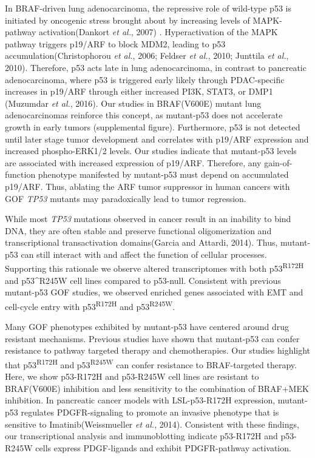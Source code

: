 In BRAF-driven lung adenocarcinoma, the repressive role of wild-type p53 is initiated by oncogenic stress brought about by increasing levels of MAPK-pathway activation(Dankort \emph{et al.}, 2007) . Hyperactivation of the MAPK pathway triggers p19/ARF to block MDM2, leading to p53 accumulation(Christophorou \emph{et al.}, 2006; Feldser \emph{et al.}, 2010; Junttila \emph{et al.}, 2010). Therefore, p53 acts late in lung adenocarcinoma, in contrast to pancreatic adenocarcinoma, where p53 is triggered early likely through PDAC-specific increases in p19/ARF through either increased PI3K, STAT3, or DMP1 (Muzumdar \emph{et al.}, 2016). Our studies in BRAF(V600E) mutant lung adenocarcinomas reinforce this concept, as mutant-p53 does not accelerate growth in early tumors (supplemental figure). Furthermore, p53 is not detected until later stage tumor development and correlates with p19/ARF expression and increased phospho-ERK1/2 levels. Our studies indicate that mutant-p53 levels are associated with increased expression of p19/ARF. Therefore, any gain-of-function phenotype manifested by mutant-p53 must depend on accumulated p19/ARF. Thus, ablating the ARF tumor suppressor in human cancers with GOF \emph{TP53} mutants may paradoxically lead to tumor regression.

While most \emph{TP53} mutations observed in cancer result in an inability to bind DNA, they are often stable and preserve functional oligomerization and transcriptional transactivation domains(Garcia and Attardi, 2014). Thus, mutant-p53 can still interact with and affect the function of cellular processes. Supporting this rationale we observe altered transcriptomes with both p53\textsuperscript{R172H} and p53\^{}R245W cell lines compared to p53-null. Consistent with previous mutant-p53 GOF studies, we observed enriched genes associated with EMT and cell-cycle entry with p53\textsuperscript{R172H} and p53\textsuperscript{R245W}.

Many GOF phenotypes exhibited by mutant-p53 have centered around drug resistant mechanisms. Previous studies have shown that mutant-p53 can confer resistance to pathway targeted therapy and chemotherapies. Our studies highlight that p53\textsuperscript{R172H} and p53\textsuperscript{R245W} can confer resistance to BRAF-targeted therapy. Here, we show p53-R172H and p53-R245W cell lines are resistant to BRAF(V600E) inhibition and less sensitivity to the combination of BRAF+MEK inhibition. In pancreatic cancer models with LSL-p53-R172H expression, mutant-p53 regulates PDGFR-signaling to promote an invasive phenotype that is sensitive to Imatinib(Weissmueller \emph{et al.}, 2014). Consistent with these findings, our transcriptional analysis and immunoblotting indicate p53-R172H and p53-R245W cells express PDGF-ligands and exhibit PDGFR-pathway activation.


